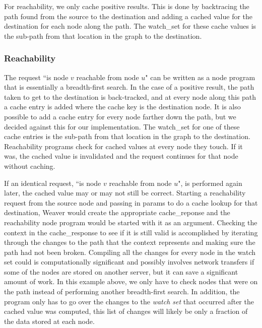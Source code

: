 \documentclass[letterpaper,twocolumn,11pt,tight]{article}
\begin{document}
For reachability, we only cache positive results. This is done by backtracing the path found from the source to the destination and adding a cached value for the destination for each node along the path. The watch\_set for these cache values is the sub-path from that location in the graph to the destination. 

\subsubsection{Reachability}
The request ``is node $v$ reachable from node $u$" can be written as a node program that is essentially a breadth-first search.
In the case of a positive result, the path taken to get to the destination is back-tracked, and at every node along this path a cache entry is added where the cache key is the destination node.
It is also possible to add a cache entry for every node farther down the path, but we decided against this for our implementation.
The watch\_set for one of these cache entries is the sub-path from that location in the graph to the destination. Reachability programs check for cached values at every node they touch. If it was, the cached value is invalidated and the request continues for that node without caching.

    If an identical request, ``is node $v$ reachable from node $u$", is performed again later, the cached value may or may not still be correct. Starting a reachability request from the source node and passing in params to do a cache lookup for that destination, Weaver would create the appropriate cache\_reponse and the reachability node program would be started with it as an argument.
    Checking the context in the cache\_response to see if it is still valid is accomplished by iterating through the changes to the path that the context represents and making sure the path had not been broken.
    Compiling all the changes for every node in the watch set could is computationally significant and possibly involves network transfers if some of the nodes are stored on another server, but it can save a significant amount of work. In this example above, we only have to check nodes that were on the path instead of performing another breadth-first search. In addition, the program only has to go over the changes to the \emph{watch set} that occurred after the cached value was computed, this list of changes will likely be only a fraction of the data stored at each node.
\end{document}
